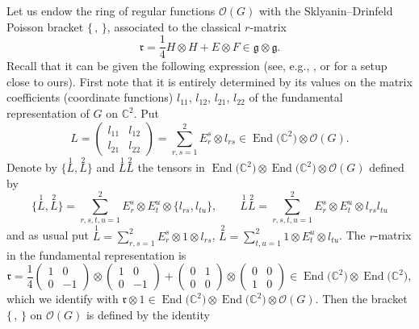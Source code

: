 \documentclass[pdftex]{sigma}%
\numberwithin{equation}{section}
\numberwithin{figure}{section}
\newcommand{\mc}{\mathbb{C}}
\begin{document}
Let us endow the ring of regular functions $\mathcal{O}(G)$ with the Sklyanin--Drinfeld Poisson bracket $\{\, ,\, \}$, associated to the classical $r$-matrix
\[
\mathfrak{r} = \frac{1}{4} H\otimes H + E \otimes F\in \mathfrak{g} \otimes \mathfrak{g}.
\]
Recall that it can be given the following expression (see, e.g., \cite{STS}, or \cite{Au,CP} for a setup close to ours). First note that it is entirely determined by its values on the matrix coefficients (coordinate functions) $l_{11}$, $l_{12}$, $l_{21}$, $l_{22}$ of the fundamental representation of $G$ on $\mc^2$. Put
\begin{equation}\label{Ldef}
L = \begin{pmatrix} l_{11} & l_{12} \\ l_{21} & l_{22} \end{pmatrix} = \sum_{r,s=1}^2 E_r^s\otimes l_{rs}\in \operatorname{End}\big(\mc^2\big) \otimes \mathcal{O}(G).
\end{equation}
Denote by $\big\{\!\stackrel{1}{L},\stackrel{2}{L}\!\big\}$ and $\stackrel{1}{L}\stackrel{2}{L}$ the tensors in $\operatorname{End}\big(\mc^2\big) \otimes \operatorname{End}\big(\mc^2\big) \otimes \mathcal{O}(G)$ defined by
\[
\big\{\!\stackrel{1}{L},\stackrel{2}{L}\!\big\} = \sum_{r,s,t,u=1}^2 E_r^s\otimes E_t^u \otimes \{l_{rs},l_{tu}\},\qquad \stackrel{1}{L}\stackrel{2}{L} = \sum_{r,s,t,u=1}^2 E_r^s\otimes E_t^u \otimes l_{rs}l_{tu}
\]
and as usual put $\stackrel{1}{L} = \sum_{r,s=1}^2 E_r^s\otimes 1 \otimes l_{rs}$, $\stackrel{2}{L} = \sum_{t,u=1}^2 1 \otimes E_t^u \otimes l_{tu}$. The $r$-matrix in the fundamental representation is
\[
\mathfrak{r} = \frac{1}{4} \begin{pmatrix} 1 & 0 \\ 0 & -1 \end{pmatrix} \otimes \begin{pmatrix} 1 & 0 \\ 0 & -1 \end{pmatrix} + \begin{pmatrix} 0 & 1 \\ 0 & 0 \end{pmatrix} \otimes \begin{pmatrix} 0 & 0 \\ 1 & 0 \end{pmatrix}\in \operatorname{End}\big(\mc^2\big) \otimes \operatorname{End}\big(\mc^2\big),
\]
which we identify with $\mathfrak{r}\otimes 1 \in \operatorname{End}\big(\mc^2\big) \otimes \operatorname{End}\big(\mc^2\big) \otimes \mathcal{O}(G)$. Then the bracket $\{\, ,\, \}$ on $\mathcal{O}(G)$ is defined by the identity
\end{document}
